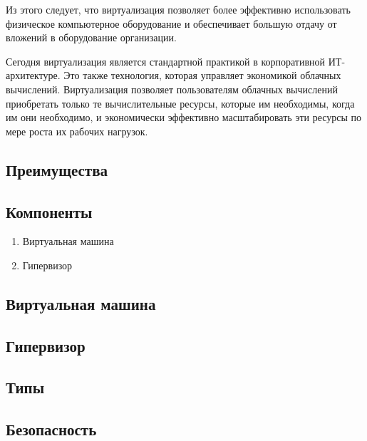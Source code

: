 Из этого следует, что виртуализация позволяет более эффективно использовать физическое компьютерное оборудование и обеспечивает большую отдачу от вложений в оборудование организации.

Сегодня виртуализация является стандартной практикой в корпоративной ИТ-архитектуре. Это также технология, которая управляет экономикой облачных вычислений. Виртуализация позволяет пользователям облачных вычислений приобретать только те вычислительные ресурсы, которые им необходимы, когда им они необходимо, и экономически эффективно масштабировать эти ресурсы по мере роста их рабочих нагрузок.

\subsection{Преимущества}\label{sec:virt_pros}
\subsection{Компоненты}\label{sec:virt_components}
\begin{enumerate}
  \item Виртуальная машина
  \item Гипервизор
\end{enumerate}

\subsection{Виртуальная машина}\label{sec:vm}
\subsection{Гипервизор}\label{sec:hyp}

\subsection{Типы}\label{sec:virt_types}

\subsection{Безопасность}\label{sec:virt_types}




